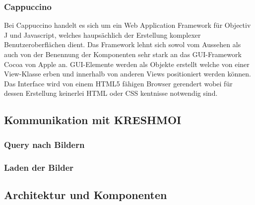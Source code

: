 \subsubsection{Cappuccino}
\label{sec:Cappuccino}
Bei Cappuccino handelt es sich um ein Web Application Framework für Objectiv J und Javascript, welches haupsächlich der Erstellung komplexer Benutzeroberflächen dient.
Das Framework lehnt sich sowol vom Aussehen als auch von der Benennung der Komponenten sehr stark an das GUI-Framework Cocoa von Apple an.
GUI-Elemente werden als Objekte erstellt welche von einer View-Klasse erben und innerhalb von anderen Views positioniert werden können.
Das Interface wird von einem HTML5 fähigen Browser gerendert wobei für dessen Erstellung keinerlei HTML oder CSS kentnisse notwendig sind.

\subsection{Kommunikation mit KRESHMOI}
\label{sec:Kommunikation mit KRESHMOI}

\subsubsection{Query nach Bildern}
\label{sec:Query nach Bildern}

\subsubsection{Laden der Bilder}
\label{sec:Laden der Bilder}


\subsection{Architektur und Komponenten}
\label{sec:Architektur und Komponenten}

